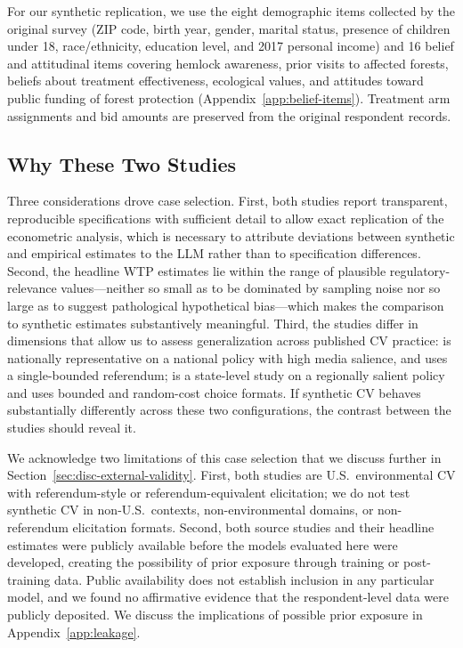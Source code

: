 \documentclass[12pt]{article}
\begin{document}
For our synthetic replication, we use the eight demographic items
collected by the original survey (ZIP code, birth year, gender, marital
status, presence of children under 18, race/ethnicity, education level,
and 2017 personal income) and 16 belief and attitudinal items
covering hemlock awareness, prior visits to affected forests, beliefs
about treatment effectiveness, ecological values, and attitudes toward
public funding of forest protection (Appendix~\ref{app:belief-items}).
Treatment arm assignments and bid amounts are preserved from the original
respondent records.

\subsection{Why These Two Studies}\label{sec:data-why}

Three considerations drove case selection. First, both studies report
transparent, reproducible specifications with sufficient detail to allow
exact replication of the econometric analysis, which is necessary to
attribute deviations between synthetic and empirical estimates to the LLM
rather than to specification differences. Second, the headline WTP
estimates lie within the range of plausible regulatory-relevance
values---neither so small as to be dominated by sampling noise nor so
large as to suggest pathological hypothetical bias---which makes the
comparison to synthetic estimates substantively meaningful. Third, the
studies differ in dimensions that allow us to assess generalization
across published CV practice: \textcite{Aldy2012} is nationally
representative on a national policy with high media salience, and uses a
single-bounded referendum; \textcite{Giguere2020} is a state-level study
on a regionally salient policy and uses bounded and random-cost choice
formats. If synthetic CV behaves substantially differently across these
two configurations, the contrast between the studies should reveal it.

We acknowledge two limitations of this case selection that we discuss
further in Section~\ref{sec:disc-external-validity}. First, both studies
are U.S.\ environmental CV with referendum-style or referendum-equivalent
elicitation; we do not test synthetic CV in non-U.S.\ contexts,
non-environmental domains, or non-referendum elicitation formats. Second, both source studies and their headline estimates were publicly
available before the models evaluated here were developed, creating the
possibility of prior exposure through training or post-training data.
Public availability does not establish inclusion in any particular model,
and we found no affirmative evidence that the respondent-level data were
publicly deposited. We discuss the implications of possible prior exposure
in Appendix~\ref{app:leakage}.
\end{document}
